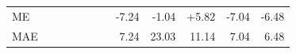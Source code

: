 \begin{tabular}{@{}l r rrrrr rrrrr@{}}
\midrule
ME &  &  &  &  &  &  & \textcolor{pyscfred}{-7.24} & \textcolor{pyscfred}{-1.04} & \textcolor{pyscfred}{+5.82} & \textcolor{pyscfred}{-7.04} & \textcolor{pyscfred}{-6.48} \\
MAE &  &  &  &  &  &  & \textcolor{pyscfred}{7.24} & \textcolor{pyscfred}{23.03} & \textcolor{pyscfred}{11.14} & \textcolor{pyscfred}{7.04} & \textcolor{pyscfred}{6.48} \\
\bottomrule
\end{tabular}
